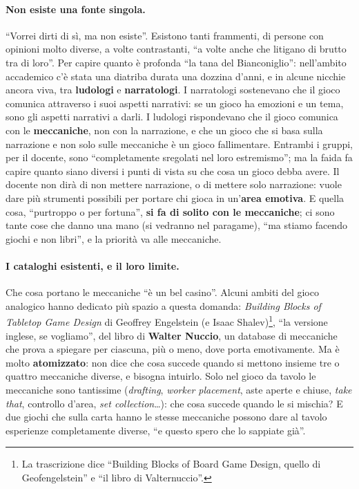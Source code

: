 \paragraph{Non esiste una fonte singola.} ``Vorrei dirti di sì, ma non esiste''.
Esistono tanti frammenti, di persone con opinioni molto diverse, a volte contrastanti,
``a volte anche che litigano di brutto tra di loro''. Per capire quanto è profonda ``la
tana del Bianconiglio'': nell'ambito accademico c'è stata una diatriba durata una
dozzina d'anni, e in alcune nicchie ancora viva, tra \textbf{ludologi} e
\textbf{narratologi}. I narratologi sostenevano che il gioco comunica attraverso i suoi
aspetti narrativi: se un gioco ha emozioni e un tema, sono gli aspetti narrativi a
darli. I ludologi rispondevano che il gioco comunica con le \textbf{meccaniche}, non
con la narrazione, e che un gioco che si basa sulla narrazione e non solo sulle
meccaniche è un gioco fallimentare. Entrambi i gruppi, per il docente, sono
``completamente sregolati nel loro estremismo''; ma la faida fa capire quanto siano
diversi i punti di vista su che cosa un gioco debba avere. Il docente non dirà di non
mettere narrazione, o di mettere solo narrazione: vuole dare più strumenti possibili
per portare chi gioca in un'\textbf{area emotiva}. E quella cosa, ``purtroppo o per
fortuna'', \textbf{si fa di solito con le meccaniche}; ci sono tante cose che danno una
mano (si vedranno nel paragame), ``ma stiamo facendo giochi e non libri'', e la
priorità va alle meccaniche.

\paragraph{I cataloghi esistenti, e il loro limite.} Che cosa portano le meccaniche
``è un bel casino''. Alcuni ambiti del gioco analogico hanno dedicato più spazio a
questa domanda: \emph{Building Blocks of Tabletop Game Design} di Geoffrey Engelstein
(e Isaac Shalev)\footnote{La trascrizione dice ``Building Blocks of Board Game Design,
quello di Geofengelstein'' e ``il libro di Valternuccio''.}, ``la versione inglese,
se vogliamo'', del libro di \textbf{Walter Nuccio}, un database di meccaniche che prova
a spiegare per ciascuna, più o meno, dove porta emotivamente. Ma è molto
\textbf{atomizzato}: non dice che cosa succede quando si mettono insieme tre o quattro
meccaniche diverse, e bisogna intuirlo. Solo nel gioco da tavolo le meccaniche sono
tantissime (\emph{drafting}, \emph{worker placement}, aste aperte e chiuse,
\emph{take that}, controllo d'area, \emph{set collection}\ldots): che cosa succede
quando le si mischia? E due giochi che sulla carta hanno le stesse meccaniche
possono dare al tavolo esperienze completamente diverse, ``e questo spero che lo
sappiate già''.

